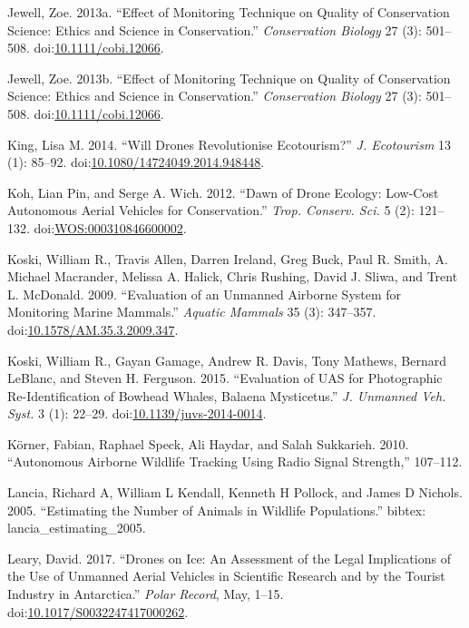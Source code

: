 \documentclass[]{interact}
\theoremstyle{plain}%
\theoremstyle{definition}
\theoremstyle{remark}
\begin{document}
\hypertarget{ref-jewell_effect_2013-1}{}
Jewell, Zoe. 2013a. ``Effect of Monitoring Technique on Quality of
Conservation Science: Ethics and Science in Conservation.''
\emph{Conservation Biology} 27 (3): 501--508.
doi:\href{https://doi.org/10.1111/cobi.12066}{10.1111/cobi.12066}.

\hypertarget{ref-jewell_effect_2013}{}
Jewell, Zoe. 2013b. ``Effect of Monitoring Technique on Quality of
Conservation Science: Ethics and Science in Conservation.''
\emph{Conservation Biology} 27 (3): 501--508.
doi:\href{https://doi.org/10.1111/cobi.12066}{10.1111/cobi.12066}.

\hypertarget{ref-king_will_2014}{}
King, Lisa M. 2014. ``Will Drones Revolutionise Ecotourism?'' \emph{J.
Ecotourism} 13 (1): 85--92.
doi:\href{https://doi.org/10.1080/14724049.2014.948448}{10.1080/14724049.2014.948448}.

\hypertarget{ref-koh_dawn_2012}{}
Koh, Lian Pin, and Serge A. Wich. 2012. ``Dawn of Drone Ecology:
Low-Cost Autonomous Aerial Vehicles for Conservation.'' \emph{Trop.
Conserv. Sci.} 5 (2): 121--132.
doi:\href{https://doi.org/WOS:000310846600002}{WOS:000310846600002}.

\hypertarget{ref-koski_evaluation_2009}{}
Koski, William R., Travis Allen, Darren Ireland, Greg Buck, Paul R.
Smith, A. Michael Macrander, Melissa A. Halick, Chris Rushing, David J.
Sliwa, and Trent L. McDonald. 2009. ``Evaluation of an Unmanned Airborne
System for Monitoring Marine Mammals.'' \emph{Aquatic Mammals} 35 (3):
347--357.
doi:\href{https://doi.org/10.1578/AM.35.3.2009.347}{10.1578/AM.35.3.2009.347}.

\hypertarget{ref-koski_evaluation_2015}{}
Koski, William R., Gayan Gamage, Andrew R. Davis, Tony Mathews, Bernard
LeBlanc, and Steven H. Ferguson. 2015. ``Evaluation of UAS for
Photographic Re-Identification of Bowhead Whales, Balaena Mysticetus.''
\emph{J. Unmanned Veh. Syst.} 3 (1): 22--29.
doi:\href{https://doi.org/10.1139/juvs-2014-0014}{10.1139/juvs-2014-0014}.

\hypertarget{ref-korner_autonomous_2010}{}
Körner, Fabian, Raphael Speck, Ali Haydar, and Salah Sukkarieh. 2010.
``Autonomous Airborne Wildlife Tracking Using Radio Signal Strength,''
107--112.

\hypertarget{ref-lancia_estimating_2005}{}
Lancia, Richard A, William L Kendall, Kenneth H Pollock, and James D
Nichols. 2005. ``Estimating the Number of Animals in Wildlife
Populations.'' bibtex: lancia\_estimating\_2005.

\hypertarget{ref-leary_drones_2017}{}
Leary, David. 2017. ``Drones on Ice: An Assessment of the Legal
Implications of the Use of Unmanned Aerial Vehicles in Scientific
Research and by the Tourist Industry in Antarctica.'' \emph{Polar
Record}, May, 1--15.
doi:\href{https://doi.org/10.1017/S0032247417000262}{10.1017/S0032247417000262}.
\end{document}
